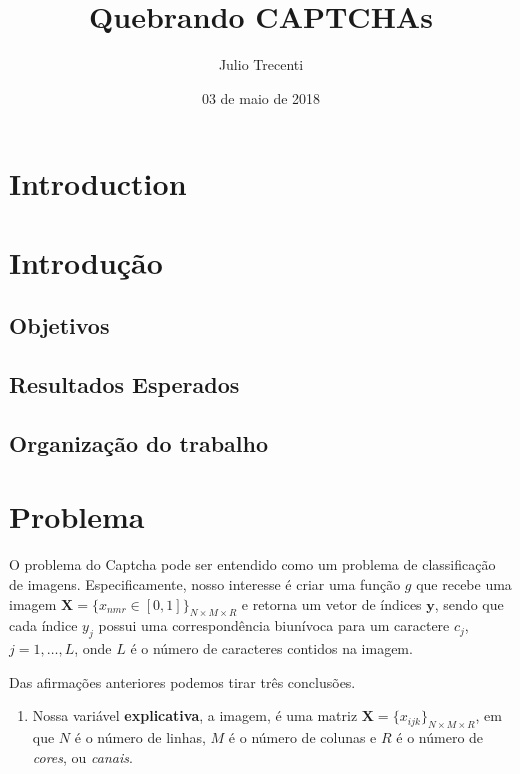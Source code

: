 \documentclass[12pt,]{report}
\title{Quebrando CAPTCHAs}
\author{Julio Trecenti}
\date{03 de maio de 2018}
\providecommand{\tightlist}{%
  \setlength{\itemsep}{0pt}\setlength{\parskip}{0pt}}
\begin{document}
\maketitle

{
\hypersetup{linkcolor=black}
\setcounter{tocdepth}{2}
\tableofcontents
}
\listoftables
\listoffigures
\chapter{Introduction}\label{introduction}

\chapter{Introdução}\label{introducao}

\section{Objetivos}\label{objetivos}

\section{Resultados Esperados}\label{resultados-esperados}

\section{Organização do trabalho}\label{organizacao-do-trabalho}

\chapter{Problema}\label{problema}

O problema do Captcha pode ser entendido como um problema de
classificação de imagens. Especificamente, nosso interesse é criar uma
função \(g\) que recebe uma imagem
\(\mathbf X = \{x_{nmr} \in [0,1]\}_{N\times M \times R}\) e retorna um
vetor de índices \(\mathbf y\), sendo que cada índice \(y_j\) possui uma
correspondência biunívoca para um caractere \(c_j\),
\(j = 1, \dots, L\), onde \(L\) é o número de caracteres contidos na
imagem.

Das afirmações anteriores podemos tirar três conclusões.

\begin{enumerate}
\def\labelenumi{\arabic{enumi}.}
\tightlist
\item
  Nossa variável \textbf{explicativa}, a imagem, é uma matriz
  \(\mathbf X = \{x_{ijk}\}_{N\times M \times R}\), em que \(N\) é o
  número de linhas, \(M\) é o número de colunas e \(R\) é o número de
  \emph{cores}, ou \emph{canais}.
\end{enumerate}
\end{document}
